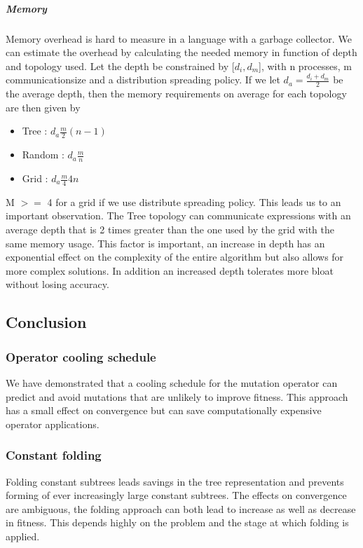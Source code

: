 \subparagraph{Memory}
Memory overhead is hard to measure in a language with a garbage collector. We can estimate the overhead by calculating the needed memory in function of depth and topology used.
Let the depth be constrained by [$d_i, d_m$], with n processes, m communicationsize and a distribution spreading policy. If we let $d_a = \frac{d_i + d_m}{2}$ be the average depth, then the memory requirements on average for each topology are then given by
\begin{itemize}
\item Tree : $d_a \frac{m}{2} (n-1)$
\item Random : $d_a \frac{m} n$
\item Grid : $d_a \frac{m}{4} 4 n$
\end{itemize}
M $>=$ 4 for a grid if we use distribute spreading policy. This leads us to an important observation. The Tree topology can communicate expressions with an average depth that is 2 times greater than the one used by the grid with the same memory usage. This factor is important, an increase in depth has an exponential effect on the complexity of the entire algorithm but also allows for more complex solutions. In addition an increased depth tolerates more bloat without losing accuracy. 
\subsection{Conclusion}
\subsubsection{Operator cooling schedule}
We have demonstrated that a cooling schedule for the mutation operator can predict and avoid mutations that are unlikely to improve fitness. This approach has a small effect on convergence but can save computationally expensive operator applications.
\subsubsection{Constant folding}
Folding constant subtrees leads savings in the tree representation and prevents forming of ever increasingly large constant subtrees. The effects on convergence are ambiguous, the folding approach can both lead to increase as well as decrease in fitness. This depends highly on the problem and the stage at which folding is applied. 
